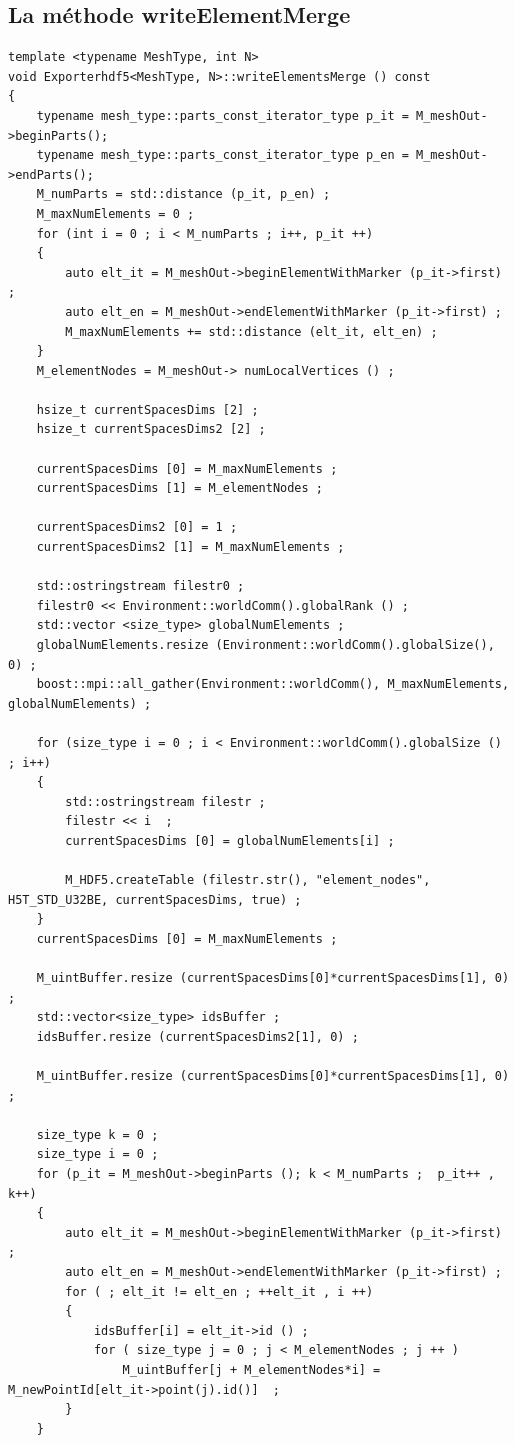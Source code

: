 \documentclass[12pt]{article}
\begin{document}
\newpage
\subsection {La méthode writeElementMerge}
\begin{lstlisting}
template <typename MeshType, int N>
void Exporterhdf5<MeshType, N>::writeElementsMerge () const 
{
    typename mesh_type::parts_const_iterator_type p_it = M_meshOut->beginParts();
    typename mesh_type::parts_const_iterator_type p_en = M_meshOut->endParts();
    M_numParts = std::distance (p_it, p_en) ;
    M_maxNumElements = 0 ;
    for (int i = 0 ; i < M_numParts ; i++, p_it ++) 
    {
        auto elt_it = M_meshOut->beginElementWithMarker (p_it->first) ;
        auto elt_en = M_meshOut->endElementWithMarker (p_it->first) ;
        M_maxNumElements += std::distance (elt_it, elt_en) ;
    }
    M_elementNodes = M_meshOut-> numLocalVertices () ;

    hsize_t currentSpacesDims [2] ;
    hsize_t currentSpacesDims2 [2] ;

    currentSpacesDims [0] = M_maxNumElements ;
    currentSpacesDims [1] = M_elementNodes ;

    currentSpacesDims2 [0] = 1 ;
    currentSpacesDims2 [1] = M_maxNumElements ;

    std::ostringstream filestr0 ;
    filestr0 << Environment::worldComm().globalRank () ;
    std::vector <size_type> globalNumElements ;
    globalNumElements.resize (Environment::worldComm().globalSize(), 0) ;
    boost::mpi::all_gather(Environment::worldComm(), M_maxNumElements, globalNumElements) ;

    for (size_type i = 0 ; i < Environment::worldComm().globalSize () ; i++)
    {
        std::ostringstream filestr ;
        filestr << i  ;
        currentSpacesDims [0] = globalNumElements[i] ;

        M_HDF5.createTable (filestr.str(), "element_nodes", H5T_STD_U32BE, currentSpacesDims, true) ;
    }
    currentSpacesDims [0] = M_maxNumElements ;

    M_uintBuffer.resize (currentSpacesDims[0]*currentSpacesDims[1], 0) ;
    std::vector<size_type> idsBuffer ;
    idsBuffer.resize (currentSpacesDims2[1], 0) ;

    M_uintBuffer.resize (currentSpacesDims[0]*currentSpacesDims[1], 0) ;

    size_type k = 0 ;
    size_type i = 0 ;
    for (p_it = M_meshOut->beginParts (); k < M_numParts ;  p_it++ , k++)
    {
        auto elt_it = M_meshOut->beginElementWithMarker (p_it->first) ;
        auto elt_en = M_meshOut->endElementWithMarker (p_it->first) ;
        for ( ; elt_it != elt_en ; ++elt_it , i ++)
        {
            idsBuffer[i] = elt_it->id () ;
            for ( size_type j = 0 ; j < M_elementNodes ; j ++ )
                M_uintBuffer[j + M_elementNodes*i] = M_newPointId[elt_it->point(j).id()]  ; 
        }
    }



\end{lstlisting}
\end{document}
